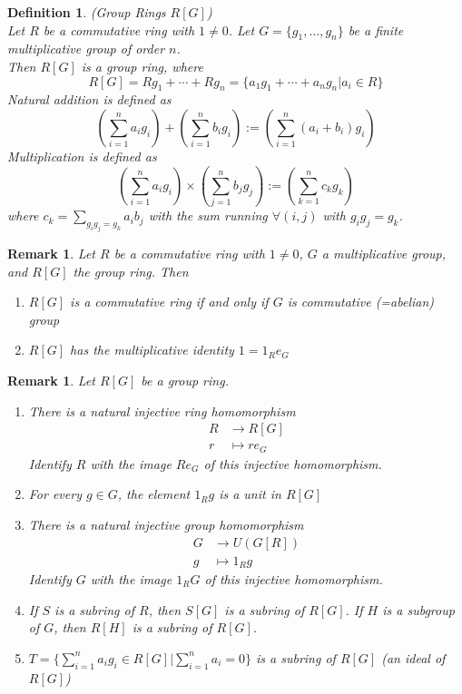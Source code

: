 \documentclass[a4paper,8pt]{article}
\theoremstyle{theorem}
\newtheorem{definition}[theorem]{Definition}
\newtheorem{remark}[theorem]{Remark}
\begin{document}
\begin{definition}
\textit{{\color{blue} (Group Rings $R[G]$)}}\\
Let $R$	be a commutative ring with $1 \neq 0$. Let $G = \{g_1, \ldots, g_n\}$ be a finite multiplicative group of order $n$.\\
Then $R[G]$ is a \textit{{\color{blue} group ring}}, where 
\begin{equation}
R[G] = Rg_1 + \cdots + Rg_n = \{a_1 g_1 + \cdots + a_n g_n | a_i \in R\} \nonumber	
\end{equation}
Natural addition is defined as 
\begin{equation}
(\sum_{i=1}^{n} a_i g_i)+ (\sum_{i=1}^{n} b_i g_i) := (\sum_{i=1}^{n} (a_i + b_i) g_i) \nonumber
\end{equation}
Multiplication is defined as 
\begin{equation}
(\sum_{i=1}^{n} a_i g_i) \times (\sum_{j=1}^{n} b_j g_j) := (\sum_{k=1}^{n} c_k g_k) \nonumber
\end{equation}
where $c_k=\sum_{g_i g_j = g_k} a_i b_j$ with the sum running $\forall (i, j)$ with $g_i g_j = g_k$.\\
\end{definition}


\begin{remark}
Let $R$ be a commutative ring with $1 \neq 0$, $G$ a multiplicative group, and $R[G]$ the group ring. Then
\begin{enumerate}[label=(\roman*)]
\item $R[G]$ is a commutative ring if and only if $G$ is commutative (=abelian) group
\item $R[G]$ has the multiplicative identity $1=1_R e_G$
\end{enumerate}
\end{remark}


\begin{remark}
Let $R[G]$ be a group ring.
\begin{enumerate}[label=(\roman*)]
\item There is a natural injective ring homomorphism 
\begin{align}
R &\rightarrow R[G] \nonumber \\
r &\mapsto r e_G \nonumber
\end{align}
Identify $R$ with the image $R e_G$ of this injective homomorphism.
\item For every $g \in G$, the element $1_R g$ is a unit in $R[G]$
\item There is a natural injective group homomorphism 
\begin{align}
G &\rightarrow U(G[R]) \nonumber \\
g &\mapsto 1_R g \nonumber
\end{align}
Identify $G$ with the image $1_R G$ of this injective homomorphism.
\item If $S$ is a subring of $R$, then $S[G]$ is a subring of $R[G]$. If $H$ is a subgroup of $G$, then $R[H]$ is a subring of $R[G]$.
\item $T = \{\sum_{i=1}^{n} a_i g_i \in R[G] | \sum_{i=1}^{n} a_i = 0\}$ is a subring of $R[G]$ (an ideal of $R[G]$)
\end{enumerate}
\end{remark}
\end{document}
